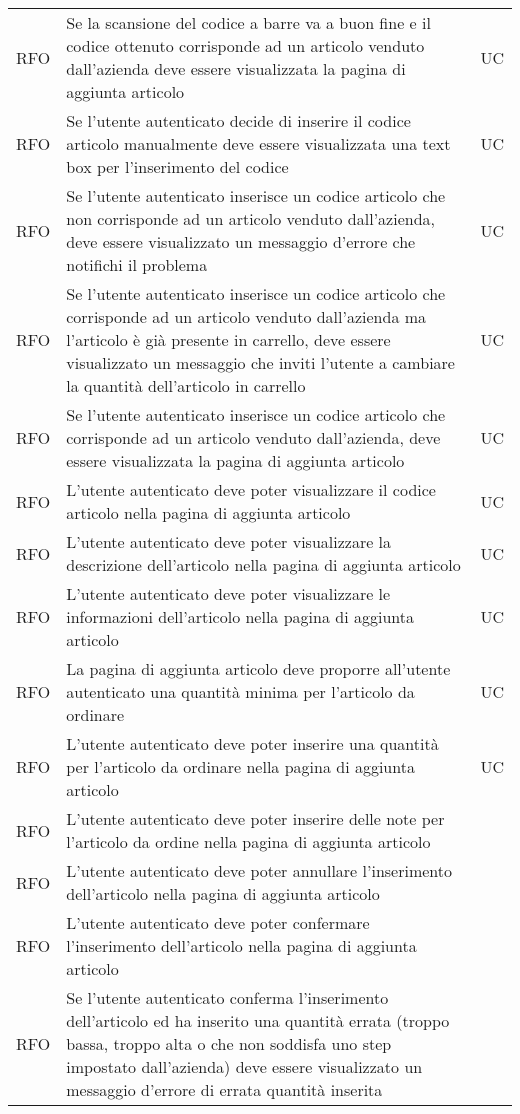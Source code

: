 \begin{table}
\begin{tabularx}{\textwidth}{lXl}
RFO & Se la scansione del codice a barre va a buon fine e il codice ottenuto corrisponde ad un articolo venduto dall'azienda deve essere visualizzata la pagina di aggiunta articolo & UC \\
RFO & Se l'utente autenticato decide di inserire il codice articolo manualmente deve essere visualizzata una text box per l'inserimento del codice & UC \\
RFO & Se l'utente autenticato inserisce un codice articolo che non corrisponde ad un articolo venduto dall'azienda, deve essere visualizzato un messaggio d'errore che notifichi il problema & UC \\
RFO & Se l'utente autenticato inserisce un codice articolo che corrisponde ad un articolo venduto dall'azienda ma l'articolo è già presente in carrello, deve essere visualizzato un messaggio che inviti l'utente a cambiare la quantità dell'articolo in carrello & UC \\
RFO & Se l'utente autenticato inserisce un codice articolo che corrisponde ad un articolo venduto dall'azienda, deve essere visualizzata la pagina di aggiunta articolo & UC \\
RFO & L'utente autenticato deve poter visualizzare il codice articolo nella pagina di aggiunta articolo & UC \\
RFO & L'utente autenticato deve poter visualizzare la descrizione dell'articolo nella pagina di aggiunta articolo & UC \\
RFO & L'utente autenticato deve poter visualizzare le informazioni dell'articolo nella pagina di aggiunta articolo & UC \\
RFO & La pagina di aggiunta articolo deve proporre all'utente autenticato una quantità minima per l'articolo da ordinare & UC \\
RFO & L'utente autenticato deve poter inserire una quantità per l'articolo da ordinare nella pagina di aggiunta articolo & UC \\
RFO & L'utente autenticato deve poter inserire delle note per l'articolo da ordine nella pagina di aggiunta articolo & \\
RFO & L'utente autenticato deve poter annullare l'inserimento dell'articolo nella pagina di aggiunta articolo & \\
RFO & L'utente autenticato deve poter confermare l'inserimento dell'articolo nella pagina di aggiunta articolo & \\
RFO & Se l'utente autenticato conferma l'inserimento dell'articolo ed ha inserito una quantità errata (troppo bassa, troppo alta o che non soddisfa uno step impostato dall'azienda) deve essere visualizzato un messaggio d'errore di errata quantità inserita & \\

\end{tabularx}
\end{table}
